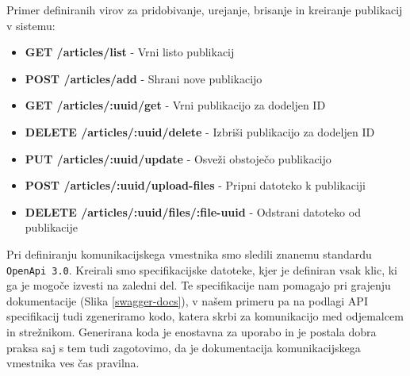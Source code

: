 \documentclass[a4paper, 12pt]{book}
\begin{document}
Primer definiranih virov za pridobivanje, urejanje, brisanje in kreiranje publikacij v sistemu:
\begin{description}
   
\begin{itemize}
    \item \textbf{GET /articles/list} - Vrni listo publikacij
    \item \textbf{POST /articles/add} - Shrani nove publikacijo
    \item \textbf{GET /articles/:uuid/get} - Vrni publikacijo za dodeljen ID 
    \item \textbf{DELETE /articles/:uuid/delete} - Izbriši publikacijo za dodeljen ID
    \item \textbf{PUT /articles/:uuid/update} - Osveži obstoječo publikacijo
    \item \textbf{POST /articles/:uuid/upload-files} - Pripni datoteko k publikaciji
    \item \textbf{DELETE /articles/:uuid/files/:file-uuid} - Odstrani datoteko od publikacije
\end{itemize}
\end{description}

Pri definiranju komunikacijskega vmestnika smo sledili znanemu standardu \verb=OpenApi 3.0=. Kreirali smo specifikacijske datoteke, kjer je definiran vsak klic, ki ga je mogoče izvesti na zaledni del. Te specifikacije nam pomagajo pri grajenju dokumentacije (Slika \ref{swagger-docs}), v našem primeru pa na podlagi API specifikacij tudi zgeneriramo kodo, katera skrbi za komunikacijo med odjemalcem in strežnikom. Generirana koda je enostavna za uporabo in je postala dobra praksa saj s tem tudi zagotovimo, da je dokumentacija komunikacijskega vmestnika ves čas pravilna. 
\end{document}
